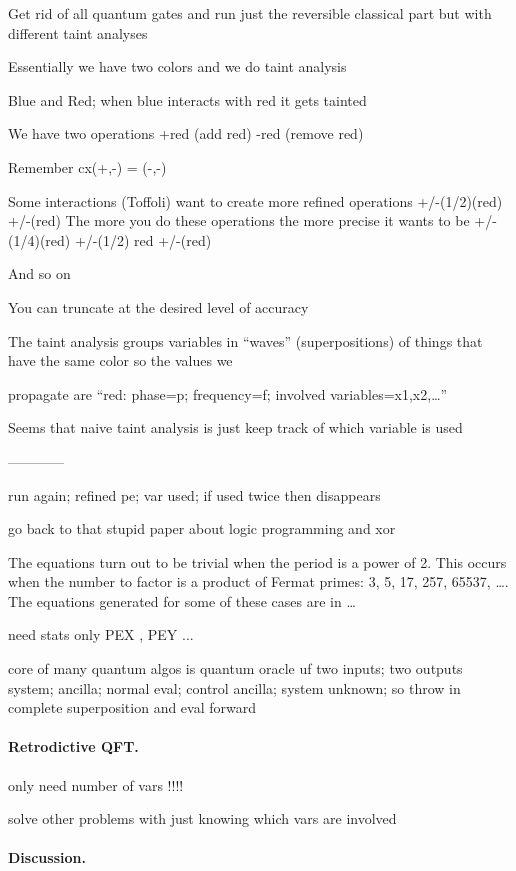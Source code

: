 \documentclass{article}
\begin{document}
\begin{refsection}
   Get rid of all quantum gates and run just the reversible classical part but with different taint analyses

   Essentially we have two colors and we do taint analysis

   Blue and Red; when blue interacts with red it gets tainted

   We have two operations +red (add red) -red (remove red)

   Remember cx(+,-) = (-,-) 

   Some interactions (Toffoli) want to create more refined operations +/-(1/2)(red) +/-(red)
   The more you do these operations the more precise it wants to be +/-(1/4)(red) +/-(1/2) red +/-(red)

   And so on

   You can truncate at the desired level of accuracy

   The taint analysis groups variables in “waves” (superpositions) of things that have the same color so the values we

     propagate are “red: phase=p; frequency=f; involved variables={x1,x2,…}”

   Seems that naive taint analysis is just keep track of which variable is used

------------

run again; refined pe; var used; if used twice then disappears

go back to that stupid paper about logic programming and xor 

The equations turn out to be trivial when the period is a power of
2. This occurs when the number to factor is a product of Fermat
primes: 3, 5, 17, 257, 65537, \ldots. The equations generated for some
of these cases are in \ldots


need stats only
PEX , PEY ...

core of many quantum algos is quantum oracle uf
two inputs; two outputs
system; ancilla;
normal eval; control ancilla; system unknown; so throw in complete superposition and
eval forward

\paragraph*{Retrodictive QFT.}

only need number of vars !!!!

solve other problems with just knowing which vars are involved

\paragraph*{Discussion.}


\end{refsection}
\end{document}
